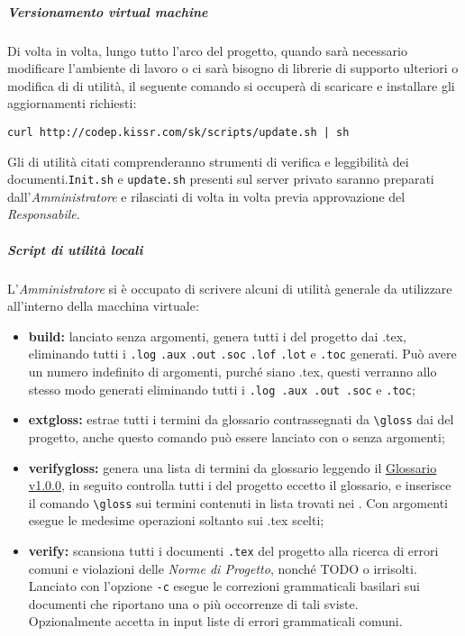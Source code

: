 \documentclass{scalatekids-article}
\begin{document}
\subparagraph{Versionamento virtual machine}
Di volta in volta, lungo tutto l'arco del progetto, quando sarà necessario
modificare l'ambiente di lavoro o ci sarà bisogno di librerie di supporto
ulteriori o modifica di  di utilità, il seguente comando si
occuperà di scaricare e installare gli aggiornamenti richiesti:
\begin{center}
  \verb=curl http://codep.kissr.com/sk/scripts/update.sh | sh=
\end{center}
Gli  di utilità citati comprenderanno strumenti di verifica e
leggibilità dei documenti.\verb=Init.sh= e \verb=update.sh=
presenti sul server privato saranno preparati dall'\textit{Amministratore} e
rilasciati di volta in volta previa approvazione del \textit{Responsabile}.
\subparagraph{Script di utilità locali}
\label{sec:script}
L'\textit{Amministratore} si è occupato di scrivere alcuni  di utilità
generale da utilizzare all'interno della macchina virtuale:
\begin{itemize}
\item\textbf{build:} lanciato senza argomenti, genera tutti i  del
  progetto dai .tex, eliminando tutti i  \verb=.log= \verb=.aux= \verb=.out= \verb=.soc=
  \verb=.lof= \verb=.lot= e \verb=.toc=
  generati. Può avere un numero indefinito di argomenti, purché siano  .tex,
  questi verranno allo stesso modo generati eliminando tutti i 
  \verb=.log .aux .out .soc= e \verb=.toc=;
\item\textbf{extgloss:} estrae tutti i termini da glossario contrassegnati da
  \verb=\gloss= dai  del progetto, anche questo comando può essere lanciato con
  o senza argomenti;
\item\textbf{verifygloss:} genera una lista di termini da glossario leggendo il
	 \href{run:../Esterni/Glossario\_v0.0.1.pdf}{Glossario v1.0.0}, in seguito controlla tutti i  del
  progetto eccetto il glossario, e inserisce il comando \verb=\gloss= sui termini
  contenuti in lista trovati nei . Con argomenti esegue le medesime
  operazioni soltanto sui  .tex scelti;
\item\textbf{verify:} scansiona tutti i documenti \verb=.tex= del progetto alla
  ricerca di errori comuni e violazioni delle \textit{Norme di Progetto}, nonché
  TODO o  irrisolti. Lanciato con l'opzione \verb=-c=
  esegue le correzioni grammaticali basilari sui documenti che riportano una o
  più occorrenze di tali sviste.\\
  Opzionalmente accetta in input liste di errori grammaticali comuni.
\end{itemize}
\end{document}
